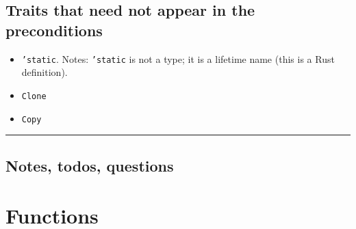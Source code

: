 \documentclass[11pt,a4paper]{article}
\theoremstyle{definition}
\newcommand{\horizline}{\noindent\rule{\textwidth}{1pt}}
\begin{document}
\subsection{Traits that need not appear in the preconditions}
\begin{itemize}
    \item \texttt{'static}. Notes: \texttt{'static} is not a type; it is a lifetime name (this is a Rust definition).
    \item \texttt{Clone}
    \item \texttt{Copy}
\end{itemize}
\horizline
\subsection{Notes, todos, questions}
\section{Functions}
\end{document}

